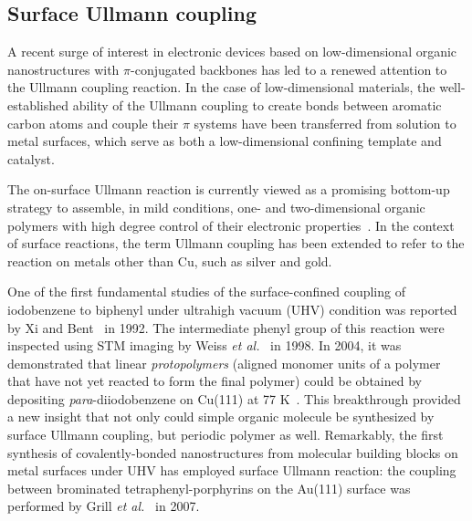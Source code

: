 \documentclass[%
 reprint,
 amsmath,amssymb,
 aps,
prb,
]{revtex4-2}
\begin{document}

\subsection{Surface Ullmann coupling}

A recent surge of interest in electronic devices based on low-dimensional organic nanostructures with $\pi$-conjugated backbones has led to a renewed attention to the Ullmann coupling reaction. 
In the case of low-dimensional materials, the well-established ability of the Ullmann coupling to create bonds between aromatic carbon atoms and couple their $\pi$ systems have been transferred from solution to metal surfaces, which serve as both a low-dimensional confining template and catalyst.

The on-surface Ullmann reaction is currently viewed as a promising bottom-up strategy to assemble, in mild conditions, one- and two-dimensional organic polymers with high degree control of their electronic properties~\cite{ullmann_33}. 
In the context of surface reactions, the term Ullmann coupling has been extended to refer to the reaction on metals other than Cu, such as silver and gold. 

One of the first fundamental studies of the surface-confined coupling of iodobenzene to biphenyl under ultrahigh vacuum (UHV) condition was reported by Xi and Bent~\cite{sur_sci01} in 1992.
The intermediate phenyl group of this reaction were inspected using STM imaging by Weiss \textit{et al.}~\cite{langm01} in 1998.
In 2004, it was demonstrated that linear \emph{protopolymers} (aligned monomer units of a polymer that have not yet reacted to form the final polymer) could be obtained by depositing \textit{para}-diiodobenzene on Cu(111) at 77 K~\cite{jacs01}. This breakthrough provided a new insight that not only could simple organic molecule be synthesized by surface Ullmann coupling, but periodic polymer as well.
Remarkably, the first synthesis of covalently-bonded nanostructures from molecular building blocks on metal surfaces under UHV has employed surface Ullmann reaction: the coupling between brominated tetraphenyl-porphyrins on the Au(111) surface was performed by Grill \textit{et al.}~\cite{Naturenano2007} in 2007.
\end{document}
